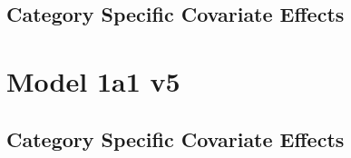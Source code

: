 \documentclass[]{article}
\begin{document}
\subsection{Category Specific Covariate Effects}

\clearpage

\section{Model 1a1 v5}
\subsection{Category Specific Covariate Effects}

\clearpage
\end{document}
